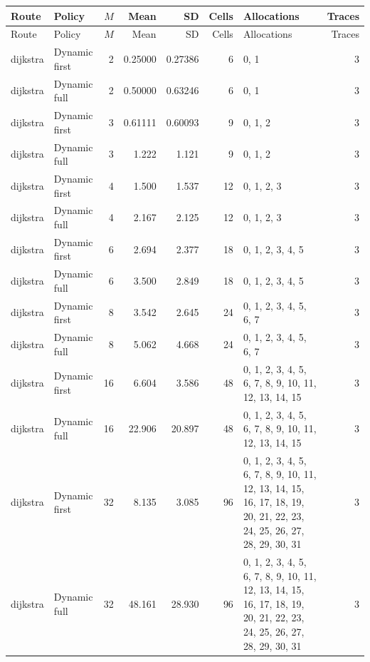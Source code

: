\documentclass[10pt,a4paper]{article}
\begin{document}
\tiny\setlength{\tabcolsep}{2pt}\begin{longtable}{@{}p{23mm}p{29mm}rrrrp{36mm}r@{}}
\toprule Route & Policy & $M$ & Mean & SD & Cells & Allocations & Traces \\ \midrule\endfirsthead
\toprule Route & Policy & $M$ & Mean & SD & Cells & Allocations & Traces \\ \midrule\endhead
\bottomrule\endfoot
dijkstra & Dynamic first & 2 & 0.25000 & 0.27386 & 6 & 0, 1 & 3 \\
dijkstra & Dynamic full & 2 & 0.50000 & 0.63246 & 6 & 0, 1 & 3 \\
dijkstra & Dynamic first & 3 & 0.61111 & 0.60093 & 9 & 0, 1, 2 & 3 \\
dijkstra & Dynamic full & 3 & 1.222 & 1.121 & 9 & 0, 1, 2 & 3 \\
dijkstra & Dynamic first & 4 & 1.500 & 1.537 & 12 & 0, 1, 2, 3 & 3 \\
dijkstra & Dynamic full & 4 & 2.167 & 2.125 & 12 & 0, 1, 2, 3 & 3 \\
dijkstra & Dynamic first & 6 & 2.694 & 2.377 & 18 & 0, 1, 2, 3, 4, 5 & 3 \\
dijkstra & Dynamic full & 6 & 3.500 & 2.849 & 18 & 0, 1, 2, 3, 4, 5 & 3 \\
dijkstra & Dynamic first & 8 & 3.542 & 2.645 & 24 & 0, 1, 2, 3, 4, 5, 6, 7 & 3 \\
dijkstra & Dynamic full & 8 & 5.062 & 4.668 & 24 & 0, 1, 2, 3, 4, 5, 6, 7 & 3 \\
dijkstra & Dynamic first & 16 & 6.604 & 3.586 & 48 & 0, 1, 2, 3, 4, 5, 6, 7, 8, 9, 10, 11, 12, 13, 14, 15 & 3 \\
dijkstra & Dynamic full & 16 & 22.906 & 20.897 & 48 & 0, 1, 2, 3, 4, 5, 6, 7, 8, 9, 10, 11, 12, 13, 14, 15 & 3 \\
dijkstra & Dynamic first & 32 & 8.135 & 3.085 & 96 & 0, 1, 2, 3, 4, 5, 6, 7, 8, 9, 10, 11, 12, 13, 14, 15, 16, 17, 18, 19, 20, 21, 22, 23, 24, 25, 26, 27, 28, 29, 30, 31 & 3 \\
dijkstra & Dynamic full & 32 & 48.161 & 28.930 & 96 & 0, 1, 2, 3, 4, 5, 6, 7, 8, 9, 10, 11, 12, 13, 14, 15, 16, 17, 18, 19, 20, 21, 22, 23, 24, 25, 26, 27, 28, 29, 30, 31 & 3 \\
\end{longtable}\normalsize\setlength{\tabcolsep}{6pt}
\clearpage
\end{document}
